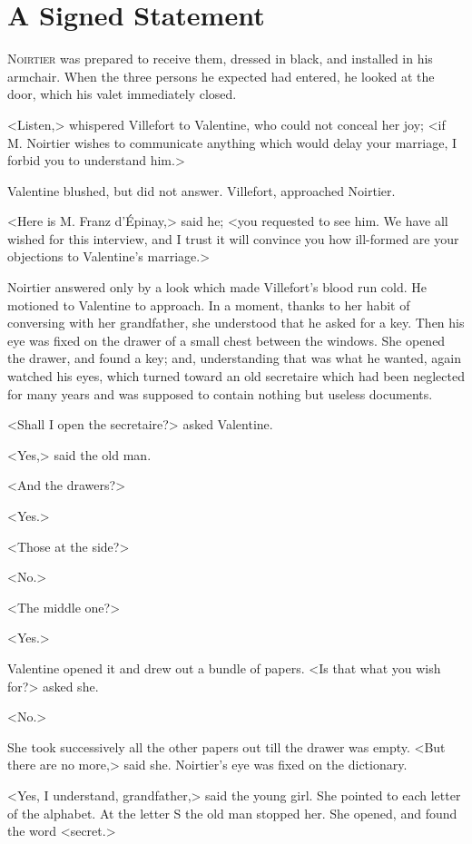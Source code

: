 \chapter{A Signed Statement} 

 \lettrine{N}{oirtier} was prepared to receive them, dressed in black, and installed in his armchair. When the three persons he expected had entered, he looked at the door, which his valet immediately closed. 

\zz
 <Listen,> whispered Villefort to Valentine, who could not conceal her joy; <if M. Noirtier wishes to communicate anything which would delay your marriage, I forbid you to understand him.> 

 Valentine blushed, but did not answer. Villefort, approached Noirtier. 

 <Here is M. Franz d'Épinay,> said he; <you requested to see him. We have all wished for this interview, and I trust it will convince you how ill-formed are your objections to Valentine's marriage.> 

 Noirtier answered only by a look which made Villefort's blood run cold. He motioned to Valentine to approach. In a moment, thanks to her habit of conversing with her grandfather, she understood that he asked for a key. Then his eye was fixed on the drawer of a small chest between the windows. She opened the drawer, and found a key; and, understanding that was what he wanted, again watched his eyes, which turned toward an old secretaire which had been neglected for many years and was supposed to contain nothing but useless documents. 

 <Shall I open the secretaire?> asked Valentine. 

 <Yes,> said the old man. 

 <And the drawers?> 

 <Yes.> 

 <Those at the side?> 

 <No.> 

 <The middle one?> 

 <Yes.> 

 Valentine opened it and drew out a bundle of papers. <Is that what you wish for?> asked she. 

 <No.> 

 She took successively all the other papers out till the drawer was empty. <But there are no more,> said she. Noirtier's eye was fixed on the dictionary. 

 <Yes, I understand, grandfather,> said the young girl.  She pointed to each letter of the alphabet. At the letter S the old man stopped her. She opened, and found the word <secret.> 

